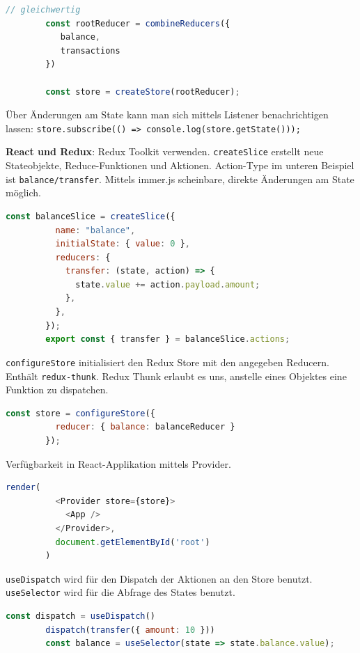 \documentclass[10pt,landscape]{article}
\begin{document}
\begin{multicols}{2}
\begin{lstlisting}[language=JavaScript]
        // gleichwertig
        const rootReducer = combineReducers({
           balance,
           transactions
        })

        const store = createStore(rootReducer);
        \end{lstlisting}

        Über Änderungen am State kann man sich mittels Listener benachrichtigen lassen: \lstinline{store.subscribe(() => console.log(store.getState()));}

        \textbf{React und Redux}: Redux Toolkit verwenden.
        \lstinline{createSlice} erstellt neue Stateobjekte, Reduce-Funktionen und Aktionen.
        Action-Type im unteren Beispiel ist \lstinline{balance/transfer}.
        Mittels immer.js scheinbare, direkte Änderungen am State möglich.

        \begin{lstlisting}[language=JavaScript]
        const balanceSlice = createSlice({
          name: "balance",
          initialState: { value: 0 },
          reducers: {
            transfer: (state, action) => {
              state.value += action.payload.amount;
            },
          },
        });
        export const { transfer } = balanceSlice.actions;
        \end{lstlisting}

        \lstinline{configureStore} initialisiert den Redux Store mit den angegeben Reducern.
        Enthält \lstinline{redux-thunk}.
        Redux Thunk erlaubt es uns, anstelle eines Objektes eine Funktion zu dispatchen.

        \begin{lstlisting}[language=JavaScript]
        const store = configureStore({
          reducer: { balance: balanceReducer }
        });
        \end{lstlisting}

        Verfügbarkeit in React-Applikation mittels Provider.

        \begin{lstlisting}[language=JavaScript]
        render(
          <Provider store={store}>
            <App />
          </Provider>,
          document.getElementById('root')
        )
        \end{lstlisting}

        \lstinline{useDispatch} wird für den Dispatch der Aktionen an den Store benutzt.
        \lstinline{useSelector} wird für die Abfrage des States benutzt.

        \begin{lstlisting}[language=JavaScript]
        const dispatch = useDispatch()
        dispatch(transfer({ amount: 10 }))
        const balance = useSelector(state => state.balance.value);
        \end{lstlisting}


\end{multicols}
\end{document}
